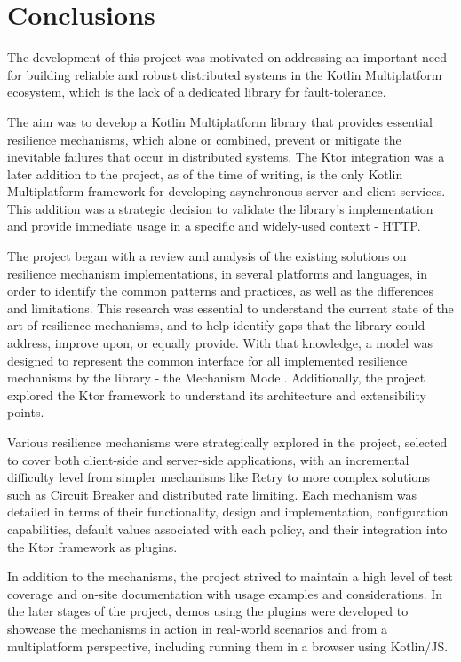 \chapter{Conclusions}\label{ch:conclusions}

The development of this project was motivated on addressing an important need
for building reliable and robust distributed systems in the Kotlin Multiplatform ecosystem, which is the lack of a dedicated library for fault-tolerance.

The aim was to develop a Kotlin Multiplatform library
that provides essential resilience mechanisms, which alone or combined, prevent or mitigate the inevitable failures that occur in distributed systems.
The Ktor integration was a later addition to the project, as of the time of writing,
is the only Kotlin Multiplatform framework for developing asynchronous server and client services.
This addition was a strategic decision to validate the library's implementation and provide immediate usage in a specific and widely-used context - HTTP.

The project began with a review and analysis
of the existing solutions on resilience mechanism implementations,
in several platforms and languages,
in order to identify the common patterns and practices, as well as the differences and limitations.
This research was essential to understand the current state of the art of resilience mechanisms,
and to help identify gaps that the library could address, improve upon, or equally provide.
With that knowledge,
a model was designed to represent the common interface for all implemented resilience mechanisms by the library -
the Mechanism Model.
Additionally, the project explored the Ktor framework to understand its architecture and extensibility points.

Various resilience mechanisms were strategically explored in the project,
selected to cover both client-side and server-side applications,
with an incremental difficulty level from simpler mechanisms like Retry to more complex solutions such as Circuit Breaker and distributed rate limiting.
Each mechanism was detailed in terms of their functionality, design and implementation, configuration capabilities, default values associated with each policy, and their integration into the Ktor framework as plugins.

In addition to the mechanisms,
the project strived
to maintain a high level of test coverage and on-site documentation with usage examples and considerations.
In the later stages of the project,
demos using the plugins were developed
to showcase the mechanisms in action in real-world scenarios and from a multiplatform perspective,
including running them in a browser using Kotlin/JS.

